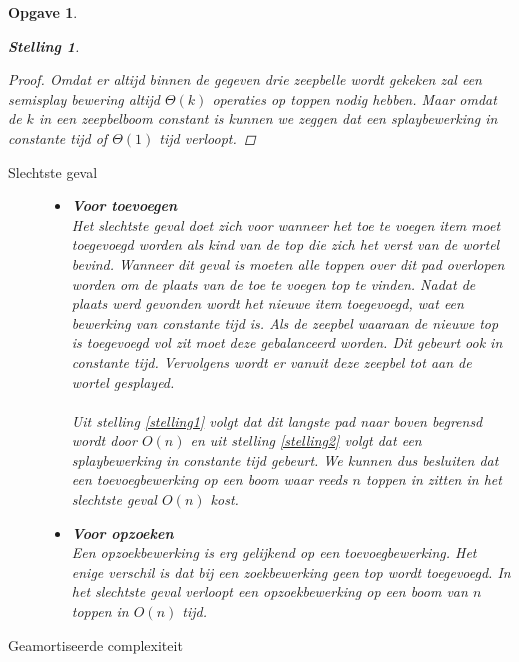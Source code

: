 \documentclass[12pt,hidelinks]{article}
\newtheorem{opgave}{Opgave}
\newtheorem{stelling}{Stelling}
\begin{document}
\begin{opgave}
\begin{stelling}
\begin{proof}
                Omdat er altijd binnen de gegeven drie zeepbelle wordt gekeken zal een semisplay bewering altijd $\Theta(k)$ operaties op toppen nodig hebben.
                Maar omdat de $k$ in een zeepbelboom constant is kunnen we zeggen dat een splaybewerking in constante tijd of $\Theta(1)$ tijd verloopt.
            \end{proof}
        \end{stelling}
        \begin{description}
            \item[Slechtste geval]
                \hfill
                \begin{itemize}
                    \item \textbf{Voor toevoegen}\\
                        Het slechtste geval doet zich voor wanneer het toe te voegen item moet toegevoegd worden als kind van de top die zich het verst van de wortel bevind. 
                        Wanneer dit geval is moeten alle toppen over dit pad overlopen worden om de plaats van de toe te voegen top te vinden.
                        Nadat de plaats werd gevonden wordt het nieuwe item toegevoegd, wat een bewerking van constante tijd is.
                        Als de zeepbel waaraan de nieuwe top is toegevoegd vol zit moet deze gebalanceerd worden. Dit gebeurt ook in constante tijd.
                        Vervolgens wordt er vanuit deze zeepbel tot aan de wortel gesplayed.
                        \\
                        \\
                        Uit stelling \ref{stelling1} volgt dat dit langste pad naar boven begrensd wordt door $O(n)$ en uit stelling \ref{stelling2} volgt dat een splaybewerking in constante tijd gebeurt.
                        We kunnen dus besluiten dat een toevoegbewerking op een boom waar reeds $n$ toppen in zitten in het slechtste geval $O(n)$ kost.
                    \item \textbf{Voor opzoeken}\\
                        Een opzoekbewerking is erg gelijkend op een toevoegbewerking. 
                        Het enige verschil is dat bij een zoekbewerking geen top wordt toegevoegd.
                        In het slechtste geval verloopt een opzoekbewerking op een boom van $n$ toppen in $O(n)$ tijd.
                \end{itemize}
            \item[Geamortiseerde complexiteit]
                \hfill

\end{description}
\end{opgave}
\end{document}

